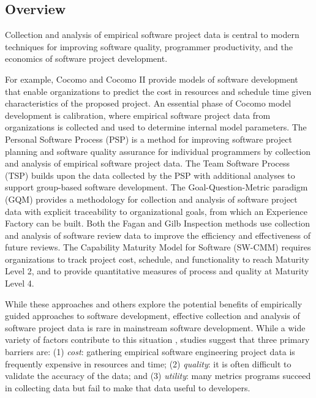 
\subsection{Overview}

Collection and analysis of empirical software project data is central to
modern techniques for improving software quality, programmer productivity,
and the economics of software project development.  

For example, Cocomo \cite{Boehm81} and Cocomo II \cite{Boehm00} provide
models of software development that enable organizations to predict the
cost in resources and schedule time given characteristics of the proposed
project.  An essential phase of Cocomo model development is
calibration, where empirical software project data from organizations is
collected and used to determine internal model parameters.  The Personal
Software Process (PSP) \cite{Humphrey95} is a method for improving software
project planning and software quality assurance for individual programmers
by collection and analysis of empirical software project data.  The Team
Software Process (TSP) \cite{Humphrey00} builds upon the data collected by
the PSP with additional analyses to support group-based software
development. The Goal-Question-Metric paradigm (GQM) \cite{Basili88}
provides a methodology for collection and analysis of software project data
with explicit traceability to organizational goals, from which an
Experience Factory \cite{Basili94} can be built.  Both the Fagan
\cite{Fagan76} and Gilb \cite{Gilb93} Inspection methods use collection and
analysis of software review data to improve the efficiency and
effectiveness of future reviews. The Capability Maturity Model for Software
(SW-CMM) \cite{Paulk95} requires organizations to track project cost,
schedule, and functionality to reach Maturity Level 2, and to provide
quantitative measures of process and quality at Maturity Level 4. 

While these approaches and others explore the potential
benefits of empirically guided approaches to software development,
effective collection and analysis of software project data is rare in
mainstream software development. While a wide variety of factors contribute
to this situation \cite{Pfleeger97}, studies suggest that three
primary barriers are: (1) {\em cost}: gathering empirical software
engineering project data is frequently expensive in resources and time; (2)
{\em quality}: it is often difficult to validate the accuracy of the data;
and (3) {\em utility}: many metrics programs succeed in collecting data but
fail to make that data useful to developers.

